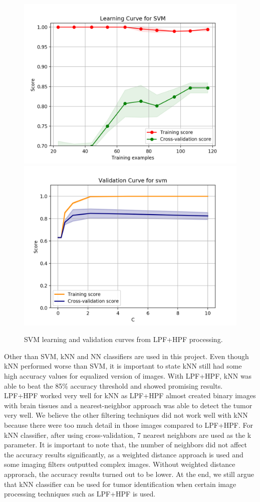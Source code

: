 \documentclass[conference]{IEEEtran}
\begin{document}
\begin{figure}[h]
\centering
\includegraphics[scale=0.26]{learning_curve}
\includegraphics[scale=0.26]{validation_curve}
\caption{SVM learning and validation curves from LPF+HPF processing.}
\end{figure}

Other than SVM, kNN and NN classifiers are used in this project. Even though kNN performed worse than SVM, it is important to state kNN still had some high accuracy values for equalized version of images. With LPF+HPF, kNN was able to beat the 85\% accuracy threshold and showed promising results. LPF+HPF worked very well for kNN as LPF+HPF almost created binary images with brain tissues and a nearest-neighbor approach was able to detect the tumor very well. We believe the other filtering techniques did not work well with kNN because there were too much detail in those images compared to LPF+HPF. For kNN classifier, after using cross-validation, 7 nearest neighbors are used as the k parameter. It is important to note that, the number of neighbors did not affect the accuracy results significantly, as a weighted distance approach is used and some imaging filters outputted complex images. Without weighted distance approrach, the accuracy results turned out to be lower. At the end, we still argue that kNN classifier can be used for tumor identification when certain image processing techniques such as LPF+HPF is used. 
\end{document}
